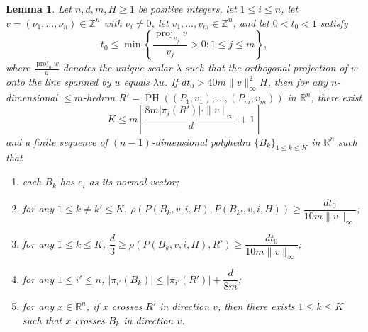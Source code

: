 \documentclass[10pt,a4paper]{amsart}
\newtheorem{lemma}[theorem]{Lemma}
\newcommand{\Z}{\mathbb Z}
\DeclareMathOperator{\proj}{proj}
\begin{document}
\begin{lemma}\label{lem:mainpoly}
Let $n, d, m, H\geq 1$ be positive integers, let $1\leq i\leq n$, let
$v=(\nu_1,\dots,\nu_n)\in \mathbb{Z}^n$ with $\nu_i\neq0$, let
$v_1,\dots, v_m\in \Z^n$, and let $0<t_0<1$ satisfy
\[
t_0\leq\min\left\{\frac{\proj_{v_j} v}{v_j}>0\colon 1\leq j\leq m\right\},
\]
where $\frac{\proj_u w}{u}$ denotes the unique scalar $\lambda$ such that the
orthogonal projection of $w$ onto the line spanned by $u$ equals $\lambda u$.
If $d t_0>40m\|v\|_\infty^2 H$, then for any $n$-dimensional
$\leq\! m$-hedron $R'=\operatorname{PH}((P_1,v_1),\dots,(P_m,v_m))$ in
$\mathbb{R}^n$, there exist
\[
K\leq m\left\lceil \frac{8m|\pi_i(R')|\cdot\|v\|_\infty}{d}+1\right\rceil
\]
and a finite sequence of $(n-1)$-dimensional polyhedra
$\{B_k\}_{1\leq k\leq K}$ in $\mathbb{R}^n$ such that
\begin{enumerate}
\item[(1)] each $B_k$ has $e_i$ as its normal vector;
\item[(2)] for any $1\leq k\neq k'\leq K$,
$\rho(P(B_k, v, i, H),P(B_{k'}, v, i, H))\geq \dfrac{d t_0}{10m\|v\|_\infty}$;
\item[(3)] for any $1\leq k\leq K$,
$\dfrac{d}{3}\geq\rho(P(B_k, v, i, H),R')\geq \dfrac{d t_0}{10m\|v\|_\infty}$;
\item[(4)] for any $1\leq i'\leq n$,
$|\pi_{i'}(B_k)|\leq |\pi_{i'}(R')|+\dfrac{d}{8m}$;
\item[(5)] for any $x\in\mathbb{R}^n$, if $x$ crosses $R'$ in direction $v$,
then there exists $1\leq k\leq K$ such that $x$ crosses $B_k$ in direction
$v$.
\end{enumerate}
\end{lemma}
\end{document}
